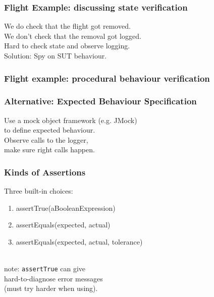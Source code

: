 \documentclass{beamer}
\newenvironment{changemargin}[1]{%
  \begin{list}{}{%
    \setlength{\topsep}{0pt}%
    \setlength{\leftmargin}{#1}%
    \setlength{\rightmargin}{1em}
    \setlength{\listparindent}{\parindent}%
    \setlength{\itemindent}{\parindent}%
    \setlength{\parsep}{\parskip}%
  }%
  \item[]}{\end{list}}
\begin{document}
\begin{frame}
  \frametitle{Flight Example: discussing state verification}

  \large
  \begin{changemargin}{2cm}
    We do check that the flight got removed.\\
    We don't check that the removal got logged.\\[1em]
    Hard to check state and observe logging.\\[1em]
    Solution: Spy on SUT behaviour.
  \end{changemargin}
\end{frame}


\begin{frame}
  \frametitle{Flight example: procedural behaviour verification}

  \small
    
\end{frame}

\begin{frame}
  \frametitle{Alternative: Expected Behaviour Specification}
  \Large
  \begin{changemargin}{2cm}
    Use a mock object framework (e.g. JMock)\\
    to define expected behaviour.\\[1em]

    Observe calls to the logger, \\
    make sure right calls happen.
  \end{changemargin}
\end{frame}

\begin{frame}
  \frametitle{Kinds of Assertions}
  \large
  \begin{changemargin}{2cm}
    Three built-in choices:
    \begin{enumerate}
    \item assertTrue(aBooleanExpression)
    \item assertEquals(expected, actual)
    \item assertEquals(expected, actual, tolerance)
    \end{enumerate}
    ~\\[1em]
    note: {\tt assertTrue} can give \\
    hard-to-diagnose error messages \\
    (must try harder when using).
  \end{changemargin}
\end{frame}
\end{document}
